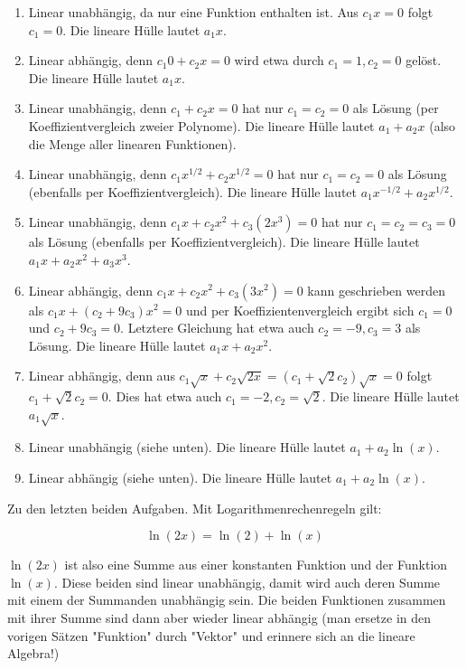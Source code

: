 \item

\begin{enumerate}
	\item Linear unabhängig, da nur eine Funktion enthalten ist. Aus $c_1 x = 0$ folgt $c_1 = 0$. Die lineare Hülle lautet $a_1x$.
	\item Linear abhängig, denn $c_1 0 + c_2 x = 0$ wird etwa durch $c_1=1, c_2 = 0$ gelöst. Die lineare Hülle lautet $a_1x$.
	\item Linear unabhängig, denn $c_1 + c_2 x = 0$ hat nur $c_1=c_2 = 0$ als Lösung (per Koeffizientvergleich zweier Polynome). Die lineare Hülle lautet $a_1+a_2x$ (also die Menge aller linearen Funktionen).
	\item Linear unabhängig, denn $c_1 x^{1/2} + c_2 x^{1/2} = 0$ hat nur $c_1=c_2 = 0$ als Lösung (ebenfalls per Koeffizientvergleich). Die lineare Hülle lautet $a_1x^{-1/2}+a_2x^{1/2}$.
	\item Linear unabhängig, denn $c_1 x + c_2 x^2 + c_3 (2x^3) = 0$ hat nur $c_1=c_2=c_3= 0$ als Lösung (ebenfalls per Koeffizientvergleich). Die lineare Hülle lautet $a_1x+a_2x^2+a_3x^3$.
	\item Linear abhängig, denn $c_1 x + c_2 x^2 + c_3 (3x^2) = 0$ kann geschrieben werden als $c_1 x + (c_2 + 9c_3)x^2 = 0$ und per Koeffizientenvergleich ergibt sich $c_1=0$ und $c_2 + 9c_3=0$. Letztere Gleichung hat etwa auch $c_2=-9, c_3=3$ als Lösung. Die lineare Hülle lautet $a_1x+a_2x^2$.
	\item Linear abhängig, denn aus $c_1 \sqrt{x} + c_2 \sqrt{2x} = (c_1 + \sqrt{2}c_2)\sqrt{x} = 0$ folgt $c_1 + \sqrt{2} c_2 = 0$. Dies hat etwa auch $c_1=-2, c_2=\sqrt{2}$. Die lineare Hülle lautet $a_1\sqrt{x}$.
	\item Linear unabhängig (siehe unten). Die lineare Hülle lautet $a_1+a_2\ln(x)$.
	\item Linear abhängig (siehe unten). Die lineare Hülle lautet $a_1+a_2\ln(x)$.
\end{enumerate}

Zu den letzten beiden Aufgaben. Mit Logarithmenrechenregeln gilt:

$$
	\ln(2x) = \ln(2) + \ln(x)
$$

$\ln(2x)$ ist also eine Summe aus einer konstanten Funktion und der Funktion $\ln(x)$. Diese beiden sind linear unabhängig, damit wird auch deren Summe mit einem der Summanden unabhängig sein. Die beiden Funktionen zusammen mit ihrer Summe sind dann aber wieder linear abhängig (man ersetze in den vorigen Sätzen "Funktion" durch "Vektor" und erinnere sich an die lineare Algebra!)

